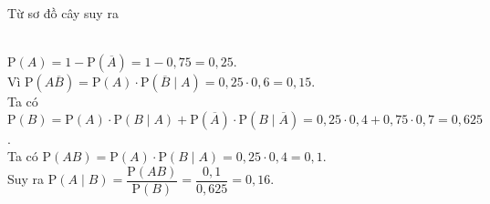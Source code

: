 \begin{ex}
{\begin{center}
	\end{center}
	Từ sơ đồ cây suy ra\\
	\begin{itemchoice}
	\\
	$\mathrm{P}\left(A\right) = 1 - \mathrm{P}\left(\overline{A}\right) = 1- 0{,}75 = 0{,}25$.
	\\
	Vì $\mathrm{P}\left(A \overline{B}\right)
	=\mathrm{P}\left(A\right) \cdot \mathrm{P}\left(\overline{B}\mid A\right)
	= 0{,}25\cdot 0{,}6=0{,}15$.
	\\
	Ta có $\mathrm{P}\left(B\right)= \mathrm{P}\left(A\right)\cdot \mathrm{P}(B\mid A)
	+ \mathrm{P}\left(\overline{A}\right)\cdot \mathrm{P}(B\mid \overline{A})
	= 0{,}25\cdot 0{,}4 + 0{,}75\cdot 0{,}7 = 0{,}625$.
	\\
	Ta có $\mathrm{P}\left(A B\right)= \mathrm{P}\left(A\right)\cdot \mathrm{P}\left(B\mid A\right)
	=0{,}25\cdot0{,}4=0{,}1$.\\
	Suy ra $\mathrm{P}\left(A\mid B\right)= \dfrac{\mathrm{P}\left(AB\right)}{\mathrm{P}\left(B\right)}
	=\dfrac{0{,}1}{0{,}625}=0{,}16$.
	\end{itemchoice}
	}
\end{ex}
